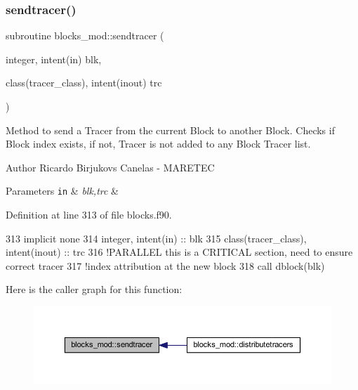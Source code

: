 \subsubsection{\texorpdfstring{sendtracer()}{sendtracer()}}
{\footnotesize\ttfamily subroutine blocks\+\_\+mod\+::sendtracer (\begin{DoxyParamCaption}\item[{integer, intent(in)}]{blk,  }\item[{class(tracer\+\_\+class), intent(inout)}]{trc }\end{DoxyParamCaption})\hspace{0.3cm}{\ttfamily [private]}}



Method to send a Tracer from the current Block to another Block. Checks if Block index exists, if not, Tracer is not added to any Block Tracer list. 

\begin{DoxyAuthor}{Author}
Ricardo Birjukovs Canelas -\/ M\+A\+R\+E\+T\+EC 
\end{DoxyAuthor}

\begin{DoxyParams}[1]{Parameters}
\mbox{\tt in}  & {\em blk,trc} & \\
\hline
\end{DoxyParams}


Definition at line 313 of file blocks.\+f90.


\begin{DoxyCode}
313     \textcolor{keywordtype}{implicit none}
314     \textcolor{keywordtype}{integer}, \textcolor{keywordtype}{intent(in)} :: blk
315     \textcolor{keywordtype}{class}(tracer\_class), \textcolor{keywordtype}{intent(inout)} :: trc
316     \textcolor{comment}{!PARALLEL this is a CRITICAL section, need to ensure correct tracer}
317     \textcolor{comment}{!index attribution at the new block}
318     \textcolor{keyword}{call }dblock(blk)%
\end{DoxyCode}
Here is the caller graph for this function\+:\nopagebreak
\begin{figure}[H]
\begin{center}
\leavevmode
\includegraphics[width=350pt]{namespaceblocks__mod_a5a9992de40470e417ec8e40e688f6a0e_icgraph}
\end{center}
\end{figure}
\mbox{\label{namespaceblocks__mod_a8f5a5d9e6cfd16cfd1b179092a204696}} 
